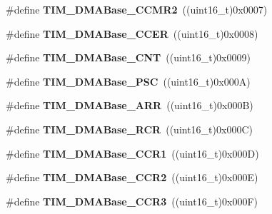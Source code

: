 \begin{DoxyCompactItemize}
\item 
\hypertarget{group__TIM__DMA__Base__address_ga4989f74592ab359f30bd7c4a4a457571}{
\#define {\bfseries TIM\_\-DMABase\_\-CCMR2}~((uint16\_\-t)0x0007)}
\label{group__TIM__DMA__Base__address_ga4989f74592ab359f30bd7c4a4a457571}

\item 
\hypertarget{group__TIM__DMA__Base__address_ga6935639db5738662520e8d0eb7116dd6}{
\#define {\bfseries TIM\_\-DMABase\_\-CCER}~((uint16\_\-t)0x0008)}
\label{group__TIM__DMA__Base__address_ga6935639db5738662520e8d0eb7116dd6}

\item 
\hypertarget{group__TIM__DMA__Base__address_gacab604257d144cf3a59b360cbc958ec9}{
\#define {\bfseries TIM\_\-DMABase\_\-CNT}~((uint16\_\-t)0x0009)}
\label{group__TIM__DMA__Base__address_gacab604257d144cf3a59b360cbc958ec9}

\item 
\hypertarget{group__TIM__DMA__Base__address_gab8dd06970f235fe9f6997e0975237388}{
\#define {\bfseries TIM\_\-DMABase\_\-PSC}~((uint16\_\-t)0x000A)}
\label{group__TIM__DMA__Base__address_gab8dd06970f235fe9f6997e0975237388}

\item 
\hypertarget{group__TIM__DMA__Base__address_gaab8a66f70e59b5916b4bba344746d652}{
\#define {\bfseries TIM\_\-DMABase\_\-ARR}~((uint16\_\-t)0x000B)}
\label{group__TIM__DMA__Base__address_gaab8a66f70e59b5916b4bba344746d652}

\item 
\hypertarget{group__TIM__DMA__Base__address_ga97f9edceee5c99b32aaa2c6daf849b7d}{
\#define {\bfseries TIM\_\-DMABase\_\-RCR}~((uint16\_\-t)0x000C)}
\label{group__TIM__DMA__Base__address_ga97f9edceee5c99b32aaa2c6daf849b7d}

\item 
\hypertarget{group__TIM__DMA__Base__address_ga235a47fa47fd19594a111e6e48c0d5a2}{
\#define {\bfseries TIM\_\-DMABase\_\-CCR1}~((uint16\_\-t)0x000D)}
\label{group__TIM__DMA__Base__address_ga235a47fa47fd19594a111e6e48c0d5a2}

\item 
\hypertarget{group__TIM__DMA__Base__address_ga0e2150dcd3afe31ecb793aa471b3b972}{
\#define {\bfseries TIM\_\-DMABase\_\-CCR2}~((uint16\_\-t)0x000E)}
\label{group__TIM__DMA__Base__address_ga0e2150dcd3afe31ecb793aa471b3b972}

\item 
\hypertarget{group__TIM__DMA__Base__address_ga590c90085bd2b206b941dff2731fed74}{
\#define {\bfseries TIM\_\-DMABase\_\-CCR3}~((uint16\_\-t)0x000F)}
\label{group__TIM__DMA__Base__address_ga590c90085bd2b206b941dff2731fed74}


\end{DoxyCompactItemize}
